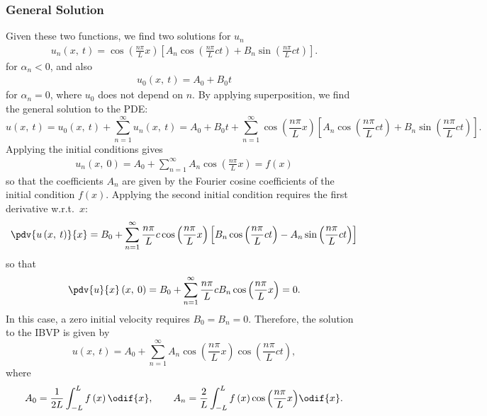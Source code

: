 \documentclass{article}
\begin{document}
\subsubsection{General Solution}
Given these two functions, we find two solutions for \(u_n\)
\begin{align*}
    u_n\left( x,\: t \right) = \cos{\left( \frac{n \pi}{L} x \right)} \left[ A_n \cos{\left( \frac{n \pi}{L} c t \right)} + B_n \sin{\left( \frac{n \pi}{L} c t \right)} \right].
\end{align*}
for \(\alpha_n < 0\), and also
\begin{align*}
    u_0\left( x,\: t \right) = A_0 + B_0 t
\end{align*}
for \(\alpha_n = 0\), where \(u_0\) does not depend on \(n\).
By applying superposition, we find the general solution to the PDE\@:
\begin{equation*}
    u\left( x,\: t \right) = u_0\left( x,\: t \right) + \sum_{n = 1}^\infty u_n\left( x,\: t \right) = A_0 + B_0 t + \sum_{n = 1}^\infty \cos{\left( \frac{n \pi}{L} x \right)} \left[ A_n \cos{\left( \frac{n \pi}{L} c t \right)} + B_n \sin{\left( \frac{n \pi}{L} c t \right)} \right].
\end{equation*}
Applying the initial conditions gives
\begin{align*}
    u_n\left( x,\: 0 \right) = A_0 + \sum_{n = 1}^\infty A_n \cos{\left( \frac{n \pi}{L} x \right)} = f\left( x \right)
\end{align*}
so that the coefficients \(A_n\) are given by the Fourier cosine coefficients of the initial condition \(f\left( x \right)\).
Applying the second initial condition requires the first derivative
w.r.t.\ \(x\):
\begin{equation*}
    \pdv{u\left( x,\: t \right)}{x} = B_0 + \sum_{n = 1}^\infty \frac{n \pi}{L} c \cos{\left( \frac{n \pi}{L} x \right)} \left[ B_n \cos{\left( \frac{n \pi}{L} c t \right)} - A_n \sin{\left( \frac{n \pi}{L} c t \right)} \right]
\end{equation*}
so that
\begin{equation*}
    \pdv{u}{x}\left( x,\: 0 \right) = B_0 + \sum_{n = 1}^\infty \frac{n \pi}{L} c B_n \cos{\left( \frac{n \pi}{L} x \right)} = 0.
\end{equation*}
In this case, a zero initial velocity requires \(B_0 = B_n = 0\).
Therefore, the solution to the IBVP is given by
\begin{equation*}
    u\left( x,\: t \right) = A_0 + \sum_{n = 1}^\infty A_n \cos{\left( \frac{n \pi}{L} x \right)} \cos{\left( \frac{n \pi}{L} c t \right)},
\end{equation*}
where
\begin{equation*}
    A_0 = \frac{1}{2L} \int_{-L}^L f\left( x \right) \odif{x}, \quad\quad A_n = \frac{2}{L} \int_{-L}^{L} f\left( x \right) \cos{\left( \frac{n \pi}{L} x \right)} \odif{x}.
\end{equation*}
\end{document}
